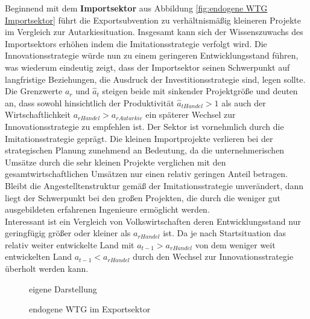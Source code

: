 Beginnend mit dem \textbf{Importsektor} aus Abbildung \ref{fig:endogene WTG Importsektor} führt die Exportsubvention zu verhältnismäßig kleineren Projekte im Vergleich zur Autarkiesituation. Insgesamt kann sich der Wissenszuwachs des Importsektors erhöhen indem die \textcolor[rgb]{0,0.32,0}{Imitationsstrategie} verfolgt wird. Die \textcolor[rgb]{0.74,0.97,0.22}{Innovationsstrategie} würde nun zu einem geringeren Entwicklungsstand führen, was wiederum eindeutig zeigt, dass der Importsektor seinen Schwerpunkt auf langfristige Beziehungen, die Ausdruck der \textcolor[rgb]{0,0.32,0}{Investitionsstrategie} sind, legen sollte. Die Grenzwerte $a_r$ und $\hat{a}_t$ steigen beide mit sinkender Projektgröße und deuten an, dass sowohl hinsichtlich der Produktivität $\hat{a}_{tHandel}>1$ als auch der Wirtschaftlichkeit $a_{rHandel}>a_{rAutarkie}$ ein späterer Wechsel zur \textcolor[rgb]{0.74,0.97,0.22}{Innovationsstrategie} zu empfehlen ist. Der Sektor ist vornehmlich durch die \textcolor[rgb]{0,0.32,0}{Imitationsstrategie} geprägt. Die kleinen Importprojekte verlieren bei der strategischen Planung zunehmend an Bedeutung, da die unternehmerischen Umsätze durch die sehr kleinen Projekte verglichen mit den gesamtwirtschaftlichen Umsätzen nur einen relativ geringen Anteil betragen. Bleibt die Angestelltenstruktur gemäß der \textcolor[rgb]{0,0.32,0}{Imitationsstrategie} unverändert, dann liegt der Schwerpunkt bei den großen Projekten, die durch die weniger gut ausgebildeten erfahrenen Ingenieure ermöglicht werden.\\ Interessant ist ein Vergleich von Volkswirtschaften deren Entwicklungsstand nur geringfügig größer oder kleiner als $a_{rHandel}$ ist. Da je nach Startsituation das relativ weiter entwickelte Land mit $a_{t-1}>a_{rHandel}$ von dem weniger weit entwickelten Land $a_{t-1}<a_{rHandel}$ durch den Wechsel zur \textcolor[rgb]{0.74,0.97,0.22}{Innovationsstrategie} überholt werden kann.\\
%
	\begin{figure}[htb]
		\hfill{}  eigene Darstellung
		\caption{endogene WTG im Exportsektor}
		\label{fig:endogene WTG Exportsektor}
	\end{figure}
